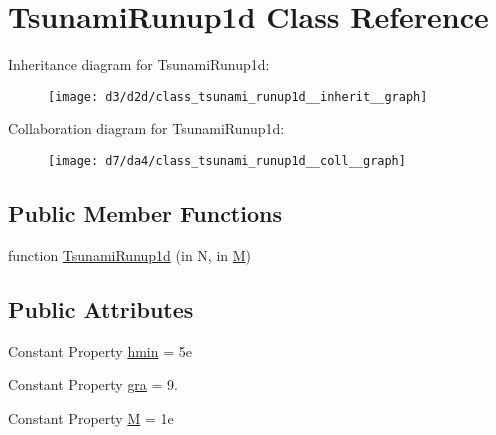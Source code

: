 \hypertarget{class_tsunami_runup1d}{}\section{Tsunami\+Runup1d Class Reference}
\label{class_tsunami_runup1d}


Inheritance diagram for Tsunami\+Runup1d\+:
\nopagebreak
\begin{figure}[H]
\begin{center}
\leavevmode
\texttt{[image: d3/d2d/class\_tsunami\_runup1d\_\_inherit\_\_graph]}
\end{center}
\end{figure}


Collaboration diagram for Tsunami\+Runup1d\+:
\nopagebreak
\begin{figure}[H]
\begin{center}
\leavevmode
\texttt{[image: d7/da4/class\_tsunami\_runup1d\_\_coll\_\_graph]}
\end{center}
\end{figure}
\subsection*{Public Member Functions}
\begin{DoxyCompactItemize}
\item 
function \hyperlink{class_tsunami_runup1d_ab51ce430f6882fcce2c7a37ca27a8ce1}{Tsunami\+Runup1d} (in N, in \hyperlink{class_tsunami_runup1d_a840f6d954608ca3027504a9ed4d6eeab}{M})
\end{DoxyCompactItemize}
\subsection*{Public Attributes}
\begin{DoxyCompactItemize}
\item 
Constant Property \hyperlink{class_tsunami_runup1d_a4cd6dc39cc11296ee3c30d86fcf5d6ab}{hmin} = 5e
\item 
Constant Property \hyperlink{class_tsunami_runup1d_aea6d4d3363da84f895bd8441543b080e}{gra} = 9.
\item 
Constant Property \hyperlink{class_tsunami_runup1d_a840f6d954608ca3027504a9ed4d6eeab}{M} = 1e
\end{DoxyCompactItemize}
